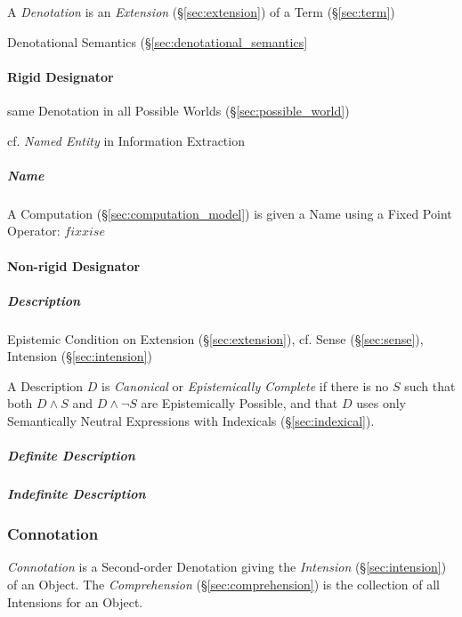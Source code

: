 A \emph{Denotation} is an \emph{Extension} (\S\ref{sec:extension}) of
a Term (\S\ref{sec:term})

Denotational Semantics (\S\ref{sec:denotational_semantics}



\paragraph{Rigid Designator}\label{sec:rigid_designator}\hfill

same Denotation in all Possible Worlds (\S\ref{sec:possible_world})

cf. \emph{Named Entity} in Information Extraction



\subparagraph{Name}\label{sec:name}\hfill

A Computation (\S\ref{sec:computation_model}) is given a Name using a
Fixed Point Operator: $fix x is e$



\paragraph{Non-rigid Designator}\label{sec:nonrigid_designator}\hfill

\subparagraph{Description}\label{sec:description}\hfill
\cite{chalmers02}

Epistemic Condition on Extension (\S\ref{sec:extension}), cf. Sense
(\S\ref{sec:sense}), Intension (\S\ref{sec:intension})

A Description $D$ is \emph{Canonical} or \emph{Epistemically Complete}
if there is no $S$ such that both $D \wedge S$ and $D \wedge \neg S$
are Epistemically Possible, and that $D$ uses only Semantically
Neutral Expressions with Indexicals (\S\ref{sec:indexical}).

\subparagraph{Definite Description}\label{sec:definite_description}\hfill

\subparagraph{Indefinite Description}\label{sec:indefinite_description}\hfill



\subsubsection{Connotation}\label{sec:connotation}

\emph{Connotation} is a Second-order Denotation giving the
\emph{Intension} (\S\ref{sec:intension}) of an Object. The
\emph{Comprehension} (\S\ref{sec:comprehension}) is the collection of
all Intensions for an Object.



